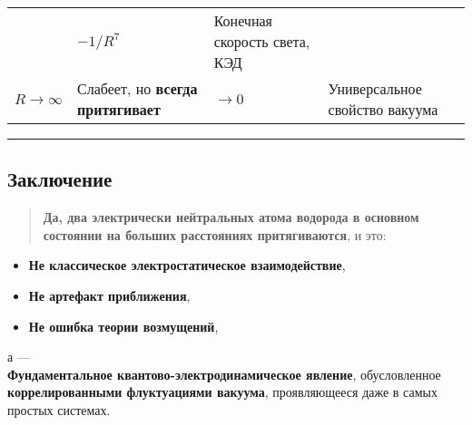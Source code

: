 \documentclass[11pt]{article}
\providecommand{\tightlist}{%
      \setlength{\itemsep}{0pt}\setlength{\parskip}{0pt}}
\begin{document}
\begin{longtable}[]{@{}llll@{}}
\begin{minipage}[t]{0.38\columnwidth}
\end{minipage} & \begin{minipage}[t]{0.17\columnwidth}\raggedright\strut
\(-1/R^7\)\strut
\end{minipage} & \begin{minipage}[t]{0.11\columnwidth}\raggedright\strut
Конечная скорость света, КЭД\strut
\end{minipage}\tabularnewline
\begin{minipage}[t]{0.21\columnwidth}\raggedright\strut
\(R \to \infty\)\strut
\end{minipage} & \begin{minipage}[t]{0.38\columnwidth}\raggedright\strut
Слабеет, но \textbf{всегда притягивает}\strut
\end{minipage} & \begin{minipage}[t]{0.17\columnwidth}\raggedright\strut
\(\to 0\)\strut
\end{minipage} & \begin{minipage}[t]{0.11\columnwidth}\raggedright\strut
Универсальное свойство вакуума\strut
\end{minipage}\tabularnewline
\bottomrule
\end{longtable}

\begin{center}\rule{0.5\linewidth}{\linethickness}\end{center}

\subsection{Заключение}\label{ux437ux430ux43aux43bux44eux447ux435ux43dux438ux435-3}

\begin{quote}
\textbf{Да, два электрически нейтральных атома водорода в основном
состоянии на больших расстояниях притягиваются}, и это:
\end{quote}

\begin{itemize}
\tightlist
\item
  \textbf{Не классическое электростатическое взаимодействие},
\item
  \textbf{Не артефакт приближения},
\item
  \textbf{Не ошибка теории возмущений},
\end{itemize}

а ---\\
\textbf{Фундаментальное квантово-электродинамическое явление},
обусловленное \textbf{коррелированными флуктуациями вакуума},
проявляющееся даже в самых простых системах.
\end{document}
